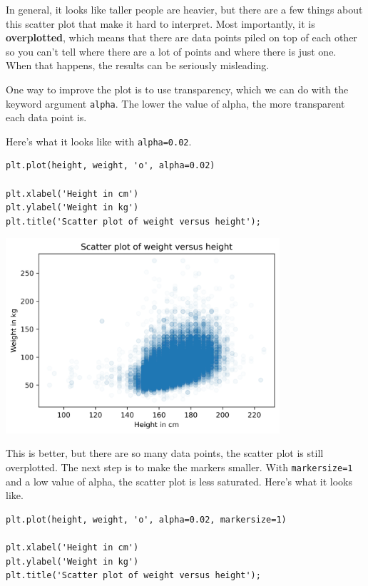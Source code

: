 In general, it looks like taller people are heavier, but there are a few
things about this scatter plot that make it hard to interpret. Most
importantly, it is \textbf{overplotted}, which means that there are data
points piled on top of each other so you can't tell where there are a
lot of points and where there is just one. When that happens, the
results can be seriously misleading.

One way to improve the plot is to use transparency, which we can do with
the keyword argument \passthrough{\lstinline!alpha!}. The lower the
value of alpha, the more transparent each data point is.

Here's what it looks like with \passthrough{\lstinline!alpha=0.02!}.

\begin{lstlisting}[]
plt.plot(height, weight, 'o', alpha=0.02)

plt.xlabel('Height in cm')
plt.ylabel('Weight in kg')
plt.title('Scatter plot of weight versus height');
\end{lstlisting}

\begin{center}
\includegraphics[width=4in]{09_relationships_files/09_relationships_15_0.png}
\end{center}

This is better, but there are so many data points, the scatter plot is
still overplotted. The next step is to make the markers smaller. With
\passthrough{\lstinline!markersize=1!} and a low value of alpha, the
scatter plot is less saturated. Here's what it looks like.

\begin{lstlisting}[]
plt.plot(height, weight, 'o', alpha=0.02, markersize=1)

plt.xlabel('Height in cm')
plt.ylabel('Weight in kg')
plt.title('Scatter plot of weight versus height');
\end{lstlisting}

